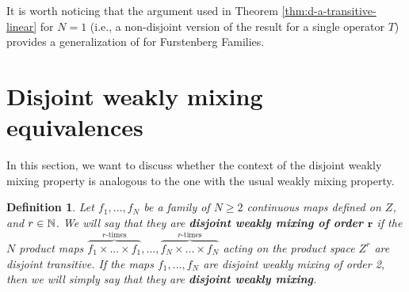 \documentclass[11pt,reqno]{article}
\newtheorem{definition}[statement]{Definition}
\def\id{\text{Id}}
\def\NN{\Bbb N}
\begin{document}
It is worth noticing that the argument used in Theorem \ref{thm:d-a-transitive-linear} for $N=1$ (i.e., a non-disjoint version of the result for a single operator $T$) provides a generalization of \cite[Theorem 2.3]{MuPe2015} for Furstenberg Families.







\section{Disjoint weakly mixing equivalences}
\label{sec:disjoint weakly mixing}

In this section, we want to discuss whether the context of the disjoint weakly mixing property is analogous to the one with the usual weakly mixing property.

\begin{definition}
Let $f_1,...,f_N$ be a family of $N\geq 2$ continuous maps defined on $Z$, and $r\in \NN$. We will say that they are \textbf{disjoint weakly mixing of order $\boldsymbol r$} if the $N$ product maps $\overbrace{f_1\times ...\times f_1}^{r\text{-times}},..., \overbrace{f_N\times...\times  f_N}^{r\text{-times}}$ acting on the product space $Z^r$ are disjoint transitive. If the maps $f_1,...,f_N$ are disjoint weakly mixing of order 2, then we will simply say that they are \textbf{disjoint weakly mixing}.
\end{definition}
\end{document}
